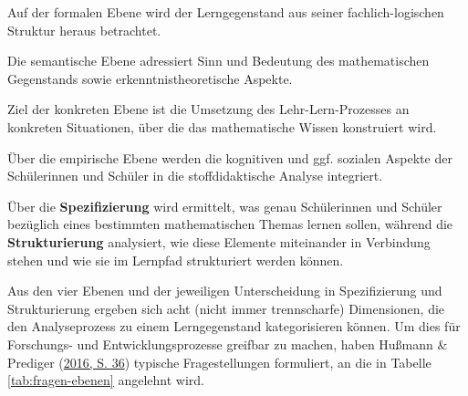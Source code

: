 \documentclass[
]{scrbook}
\theoremstyle{definition}
\theoremstyle{definition}
\theoremstyle{definition}
\theoremstyle{definition}
\theoremstyle{remark}
\begin{document}
Auf der \textcolor{formalColor}{formalen Ebene} wird der Lerngegenstand aus seiner fachlich-logischen Struktur heraus betrachtet.

Die \textcolor{semanticColor}{semantische Ebene} adressiert Sinn und Bedeutung des mathematischen Gegenstands sowie erkenntnistheoretische Aspekte.

Ziel der \textcolor{concreteColor}{konkreten Ebene} ist die Umsetzung des Lehr-Lern-Prozesses an konkreten Situationen, über die das mathematische Wissen konstruiert wird.

Über die \textcolor{empiricColor}{empirische Ebene} werden die kognitiven und ggf. sozialen Aspekte der Schülerinnen und Schüler in die stoffdidaktische Analyse integriert.

Über die \textbf{Spezifizierung} wird ermittelt, was genau Schülerinnen und Schüler bezüglich eines bestimmten mathematischen Themas lernen sollen, während die \textbf{Strukturierung} analysiert, wie diese Elemente miteinander in Verbindung stehen und wie sie im Lernpfad strukturiert werden können.

Aus den vier Ebenen und der jeweiligen Unterscheidung in Spezifizierung und Strukturierung ergeben sich acht (nicht immer trennscharfe) Dimensionen, die den Analyseprozess zu einem Lerngegenstand kategorisieren können. Um dies für Forschungs- und Entwicklungsprozesse greifbar zu machen, haben Hußmann \& Prediger (\protect\hyperlink{ref-Hussmann:2016}{2016, S. 36}) typische Fragestellungen formuliert, an die in Tabelle \ref{tab:fragen-ebenen} angelehnt wird.
\end{document}
